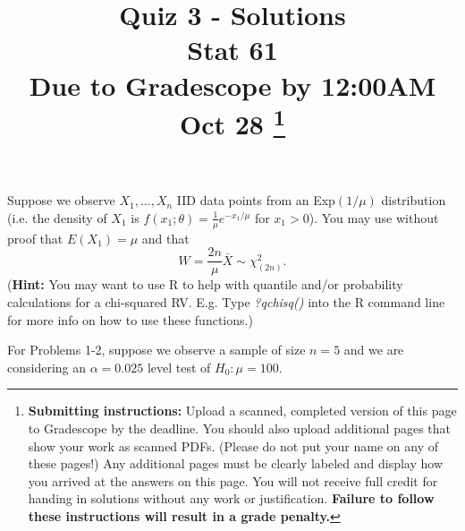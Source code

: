 \documentclass[12pt]{article}
\title{Quiz 3 - Solutions\\
Stat 61\\ 
Due to Gradescope by 12:00AM Oct 28
\footnote{\textbf{Submitting instructions:} Upload a scanned, completed version of this page to Gradescope by the deadline. You should also upload additional pages that show your work as scanned PDFs. (Please do not put your name on any of these pages!) Any additional pages must be clearly labeled and display how you arrived at the answers on this page. You will not receive full credit for handing in solutions without any work or justification. \textbf{Failure to follow these instructions will result in a grade penalty.}}
}
\date{}
\begin{document}
\maketitle

\vspace{-2.2cm}

\noindent Suppose we observe $X_1, \dots, X_n$ IID data points from an Exp$(1/ \mu)$ distribution (i.e. the density of $X_1$ is $f(x_1;\theta) = \frac{1}{\mu}e^{-x_1/\mu}$ for $x_1 > 0$). You may use without proof that $E(X_1) = \mu$ and that 
$$W = \frac{2n}{\mu} \bar{X} \sim \chi_{(2n)}^{2}.$$ 
(\textbf{Hint:} You may want to use R to help with quantile and/or probability calculations for a chi-squared RV. E.g. Type \textit{?qchisq()} into the R command line for more info on how to use these functions.) 

\vspace{0.5cm}
\noindent For Problems 1-2, suppose we observe a sample of size $n=5$ and we are considering an $\alpha=0.025$ level test of $H_0: \mu = 100$. 
\end{document}

